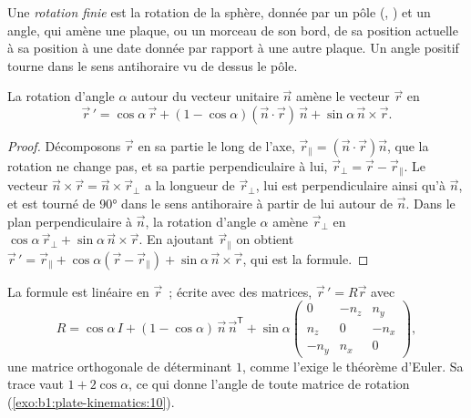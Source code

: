 \begin{definition}\label{def:b1:plate-kinematics:finite-rotation}
Une \emph{rotation finie} est la rotation de la sphère,
donnée par un pôle (, ) et un angle, qui amène une plaque, ou un
morceau de son bord, de sa position actuelle à sa position à une date donnée
par rapport à une autre plaque. Un angle positif tourne dans le sens antihoraire vu de dessus
le pôle.
\end{definition}

\begin{proposition}\label{prop:b1:plate-kinematics:rodrigues}
La rotation d'angle $\alpha$ autour du vecteur unitaire $\vec n$ amène le
vecteur $\vec r$ en
\[
  \vec r\,' = \cos\alpha\,\vec r + (1 - \cos\alpha)(\vec n\cdot\vec r)\,\vec n
  + \sin\alpha\,\vec n\times\vec r .
\]
\end{proposition}

\begin{proof}
Décomposons $\vec r$ en sa partie le long de l'axe, $\vec r_\parallel =
(\vec n\cdot\vec r)\vec n$, que la rotation ne change pas, et sa partie
perpendiculaire à lui, $\vec r_\perp = \vec r - \vec r_\parallel$. Le vecteur
$\vec n\times\vec r = \vec n\times\vec r_\perp$ a la longueur de $\vec r_\perp$,
lui est perpendiculaire ainsi qu'à $\vec n$, et est tourné de \ang{90} dans le sens antihoraire à partir de
lui autour de $\vec n$. Dans le plan perpendiculaire à $\vec n$, la rotation d'angle
$\alpha$ amène $\vec r_\perp$ en $\cos\alpha\,\vec r_\perp +
\sin\alpha\,\vec n\times\vec r$. En ajoutant $\vec r_\parallel$ on obtient $\vec r\,' =
\vec r_\parallel + \cos\alpha(\vec r - \vec r_\parallel) + \sin\alpha\,
\vec n\times\vec r$, qui est la formule.
\end{proof}

La formule est linéaire en $\vec r$~; écrite avec des matrices, $\vec r\,' = R\vec r$
avec
\[
  R = \cos\alpha\,I + (1 - \cos\alpha)\,\vec n\,\vec n^{\mathsf T}
  + \sin\alpha
  \begin{pmatrix} 0 & -n_z & n_y\\ n_z & 0 & -n_x\\ -n_y & n_x & 0\end{pmatrix},
\]
une matrice orthogonale de déterminant $1$, comme l'exige le théorème d'Euler. Sa trace
vaut $1 + 2\cos\alpha$, ce qui donne l'angle de toute matrice de rotation
(\cref{exo:b1:plate-kinematics:10}).

